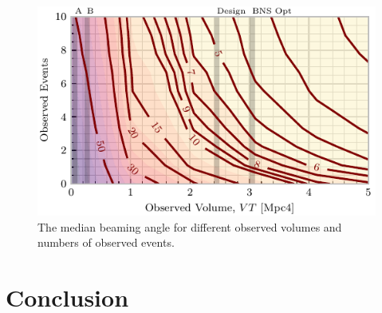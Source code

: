 \documentclass[twocolumn,nofootinbib]{revtex4-1}
\begin{document}
\begin{figure}
\centering
\includegraphics[width=\linewidth]{volume_v_nevents.pdf}
\caption{\label{fig:volumevevents} The median beaming angle for different observed volumes and numbers of observed events.}

\end{figure}

\section{Conclusion}
\end{document}
